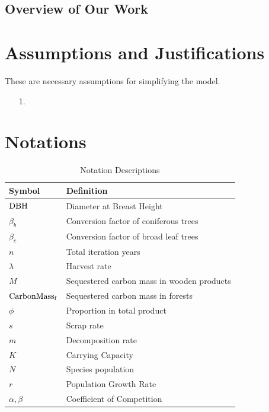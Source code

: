 \documentclass{mcmthesis}
\numberwithin{figure}{section}
\numberwithin{table}{section}
\numberwithin{equation}{section}
\begin{document}
\subsection{Overview of Our Work}




\section{Assumptions and Justifications}
These are necessary assumptions for simplifying the model.
\begin{enumerate}
  \item [1.] 
\end{enumerate}

\newpage

\section{Notations}

\renewcommand\arraystretch{1.5}

\begin{table}[htpb!]
  \centering
  \caption{Notation Descriptions}
  \begin{tabular}{m{2.5cm}<{\centering}|m{12.5cm}<{\centering}}
  \toprule[1.5pt]
  \textbf{Symbol} & \textbf{Definition} \\ \hline
  $ \rm{DBH} $ & Diameter at Breast Height \\
  $ \beta_b $ & Conversion factor of coniferous trees\\
  $\beta_c$ & Conversion factor of broad leaf trees\\
  $ n $ & Total iteration years\\
  $ \lambda $ & Harvest rate\\
  $ M $ & Sequestered carbon mass in wooden products \\
  $ \rm{CarbonMass_f} $ & Sequestered carbon mass in forests \\
  $ \phi $ & Proportion in total product\\
  $ s $ & Scrap rate\\
  $ m $ & Decomposition rate \\
  $ K $ & Carrying Capacity \\
  $ N $ & Species population \\
  $ r $ & Population Growth Rate\\
  $ \alpha,\beta $ & Coefficient of Competition\\
  

  \bottomrule[1.5pt]
  \end{tabular}
\end{table}
\end{document}
